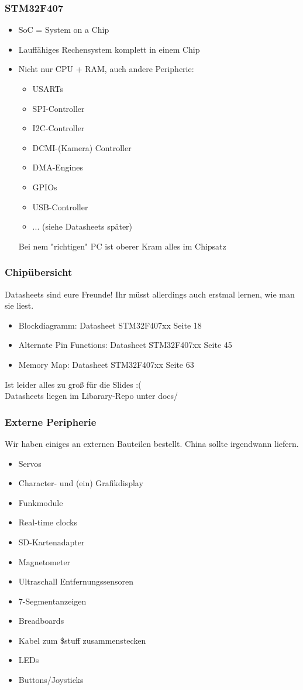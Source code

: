 \documentclass[ngerman,compress]{beamer}
\begin{document}
\begin{frame}
	\frametitle{STM32F407}
	\begin{itemize}
		\item SoC = System on a Chip
		\item Lauffähiges Rechensystem komplett in einem Chip
		\item Nicht nur CPU + RAM, auch andere Peripherie:
		\begin{itemize}
			\item USARTs
			\item SPI-Controller
			\item I2C-Controller
			\item DCMI-(Kamera) Controller
			\item DMA-Engines
			\item GPIOs
			\item USB-Controller
			\item ... (siehe Datasheets später)
		\end{itemize}
		Bei nem "richtigen" PC ist oberer Kram alles im Chipsatz
	\end{itemize}
\end{frame}

\begin{frame}
	\frametitle{Chipübersicht}
	Datasheets sind eure Freunde! Ihr müsst allerdings auch erstmal lernen, wie man sie liest.
	\begin{itemize}
		\item Blockdiagramm: Datasheet STM32F407xx Seite 18
		\item Alternate Pin Functions: Datasheet STM32F407xx Seite 45
		\item Memory Map: Datasheet STM32F407xx Seite 63
	\end{itemize}
	Ist leider alles zu groß für die Slides :( \\
	Datasheets liegen im Libarary-Repo unter docs/
\end{frame}


\begin{frame}
	\frametitle{Externe Peripherie}
	Wir haben einiges an externen Bauteilen bestellt. China sollte irgendwann liefern.
	\begin{itemize}
		\item Servos
		\item Character- und (ein) Grafikdisplay
		\item Funkmodule
		\item Real-time clocks
		\item SD-Kartenadapter
		\item Magnetometer
		\item Ultraschall Entfernungssensoren
		\item 7-Segmentanzeigen
		\item Breadboards
		\item Kabel zum \$stuff zusammenstecken
		\item LEDs
		\item Buttons/Joysticks
	\end{itemize}
\end{frame}
\end{document}
